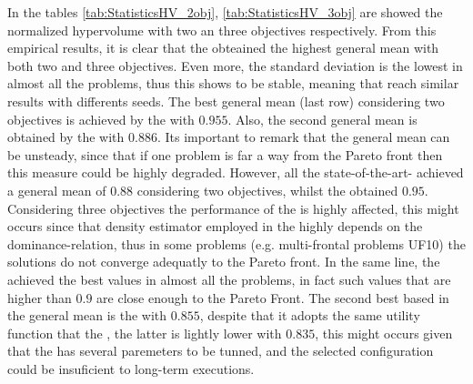 In the tables \ref{tab:StatisticsHV_2obj}, \ref{tab:StatisticsHV_3obj} are showed the normalized hypervolume with two an three objectives respectively.
%
From this empirical results, it is clear that the \VSDMOEA{} obteained the highest general mean \HV{} with both two and three objectives.
%
Even more, the standard deviation is the lowest in almost all the problems, thus this \MOEA{} shows to be stable, meaning that reach similar results with differents seeds.
%
The best general mean (last row) considering two objectives is achieved by the \VSDMOEA{} with $0.955$.
%
Also, the second general mean is obtained by the \NSGAII{} with $0.886$.
%
Its important to remark that the general mean can be unsteady, since that if one problem is far a way from the Pareto front then this measure could be highly degraded. 
%
However, all the state-of-the-art-\MOEAS{} achieved a general mean of $0.88$ considering two objectives, whilst the \VSDMOEA{} obtained $0.95$.
%
Considering three objectives the performance of the \NSGAII{} is highly affected, this might occurs since that density estimator employed in the \NSGAII{} highly depends on the dominance-relation, thus in some problems (e.g. multi-frontal problems UF10) the solutions do not converge adequatly to the Pareto front.
%
In the same line, the \VSDMOEA{} achieved the best \HV{} values in almost all the problems, in fact such values that are higher than $0.9$ are close enough to the Pareto Front.
%
The second best \MOEA{} based in the general mean is the \RMOEA{} with $0.855$, despite that it adopts the same utility function that the \MOEAD{}, the latter is lightly lower with $0.835$, this might occurs given that the \MOEAD{} has several paremeters to be tunned, and the selected configuration could be insuficient to long-term executions.
%


